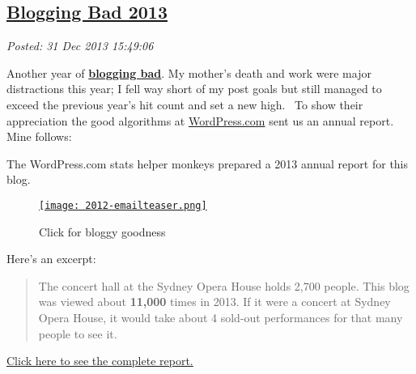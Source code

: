 %

\subsection*{\href{https://bakerjd99.wordpress.com/2013/12/31/blogging-bad-2013/}{Blogging Bad 2013}}


\noindent\emph{Posted: 31 Dec 2013 15:49:06}
\vspace{6pt}

Another year of \href{http://www.buzzfeed.com/regajha/21-things-youre-sick-of-hearing-if-you-dont-watc}{\textbf{blogging bad}}. My mother's death and work were
major distractions this year; I fell way short of my post goals but
still managed to exceed the previous year's hit count and set a new
high. ~To show their appreciation the good algorithms at \href{http://wordpress.com/}{WordPress.com}
sent us an annual report. Mine follows:

\medskip

The WordPress.com stats helper monkeys prepared a 2013 annual report for
this blog.

\captionsetup[floatingfigure]{labelformat=empty}
\begin{figure}[htbp]
\centering
\href{http://bakerjd99.wordpress.com/2013/annual-report/}{\texttt{[image: 2012-emailteaser.png]}}
\caption{Click for bloggy goodness}
\label{fig:4473X0}
\end{figure}

Here's an excerpt:

\begin{quote}
The concert hall at the Sydney Opera House holds 2,700 people. This blog
was viewed about \textbf{11,000} times in 2013. If it were a concert at
Sydney Opera House, it would take about 4 sold-out performances for that
many people to see it.
\end{quote}

\href{http://bakerjd99.wordpress.com/2013/annual-report/}{Click here to
see the complete report.}




%